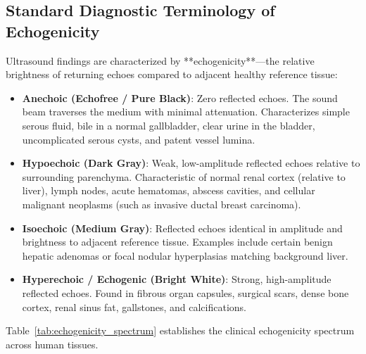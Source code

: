 \documentclass[11pt,a4paper]{article}
\begin{document}
\subsection{Standard Diagnostic Terminology of Echogenicity}
Ultrasound findings are characterized by **echogenicity**—the relative brightness of returning echoes compared to adjacent healthy reference tissue:
\begin{itemize}[leftmargin=*]
    \item \textbf{Anechoic (Echofree / Pure Black)}: Zero reflected echoes. The sound beam traverses the medium with minimal attenuation. Characterizes simple serous fluid, bile in a normal gallbladder, clear urine in the bladder, uncomplicated serous cysts, and patent vessel lumina.
    \item \textbf{Hypoechoic (Dark Gray)}: Weak, low-amplitude reflected echoes relative to surrounding parenchyma. Characteristic of normal renal cortex (relative to liver), lymph nodes, acute hematomas, abscess cavities, and cellular malignant neoplasms (such as invasive ductal breast carcinoma).
    \item \textbf{Isoechoic (Medium Gray)}: Reflected echoes identical in amplitude and brightness to adjacent reference tissue. Examples include certain benign hepatic adenomas or focal nodular hyperplasias matching background liver.
    \item \textbf{Hyperechoic / Echogenic (Bright White)}: Strong, high-amplitude reflected echoes. Found in fibrous organ capsules, surgical scars, dense bone cortex, renal sinus fat, gallstones, and calcifications.
\end{itemize}

Table~\ref{tab:echogenicity_spectrum} establishes the clinical echogenicity spectrum across human tissues.
\end{document}
